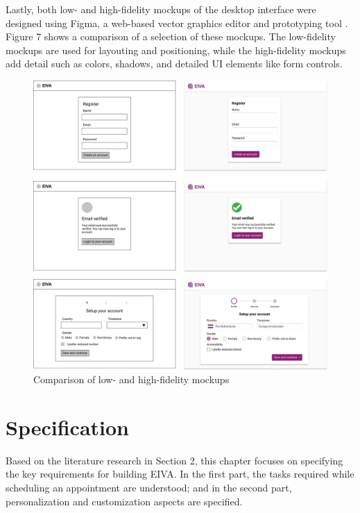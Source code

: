 \documentclass{article}
\begin{document}
Lastly, both low- and high-fidelity mockups of the desktop interface were designed using Figma, a web-based vector graphics editor and prototyping tool \cite{noauthor_23-year-olds_nodate}. Figure 7 shows a comparison of a selection of these mockups. The low-fidelity mockups are used for layouting and positioning, while the high-fidelity mockups add detail such as colors, shadows, and detailed UI elements like form controls.

\vspace{15mm}

\begin{figure}[h]
	\includegraphics[width=\textwidth]{mockup-1.png}
	\caption{Comparison of low- and high-fidelity mockups}
\end{figure}

\clearpage

\section{Specification}

Based on the literature research in Section 2, this chapter focuses on specifying the key requirements for building EIVA. In the first part, the tasks required while scheduling an appointment are understood; and in the second part, personalization and customization aspects are specified.
\end{document}
